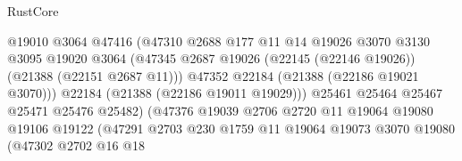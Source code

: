 \begin{lexlean}{RustCore}
\begin{coremodule}
                                          @19010
                                          @3064
                                          @47416
                                          (@47310
                                            @2688
                                            @177
                                            @11
                                            @14
                                            @19026
                                            @3070
                                            @3130
                                            @3095
                                            @19020
                                            @3064
                                            (@47345
                                              @2687
                                              @19026
                                              (@22145 (@22146 @19026))
                                              (@21388 (@22151 @2687 @11)))
                                            @47352
                                            @22184
                                            (@21388 (@22186 @19021 @3070)))
                                          @22184
                                          (@21388 (@22186 @19011 @19029)))
                                        @25461
                                        @25464
                                        @25467
                                        @25471
                                        @25476
                                        @25482)
                                      (@47376
                                        @19039
                                        @2706
                                        @2720
                                        @11
                                        @19064
                                        @19080
                                        @19106
                                        @19122
                                        (@47291
                                          @2703
                                          @230
                                          @1759
                                          @11
                                          @19064
                                          @19073
                                          @3070
                                          @19080
                                          (@47302
                                            @2702
                                            @16
                                            @18

\end{coremodule}
\end{lexlean}
